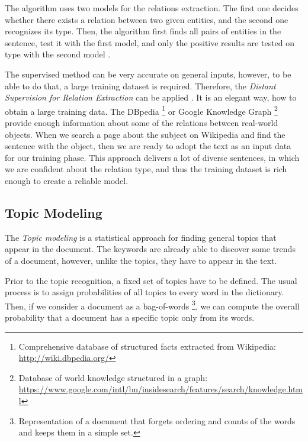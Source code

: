 \documentclass[
  digital, %
  table,   %
  lof,     %
  lot,     %
]{fithesis3}
\begin{document}
The algorithm uses two models for the relations extraction.
The first one decides whether there exists a relation between two given entities, and the second one recognizes its type. Then, the algorithm first finds all pairs of entities in the sentence, test it with the first model, and only the positive results are tested on type with the second model \cite[sec. 21.2]{jurafsky2014speech}.

The supervised method can be very accurate on general inputs, however, to be able to do that, a large training dataset is required.
Therefore, the \textit{Distant Supervision for Relation Extraction} can be applied \cite{mintz2009distant}.
It is an elegant way, how to obtain a large training data.
The DBpedia \footnote{Comprehensive database of structured facts extracted from Wikipedia: \mbox{\url{http://wiki.dbpedia.org/}}} or 
Google Knowledge Graph \footnote{Database of world knowledge structured in a graph: \url{https://www.google.com/intl/bn/insidesearch/features/search/knowledge.html}}
provide enough information about some of the relations between real-world objects.
When we search a page about the subject on Wikipedia and find the sentence with the object, then we are ready to adopt the text as an input data for our training phase.
This approach delivers a lot of diverse sentences, in which we are confident about the relation type, and thus the training dataset is rich enough to create a reliable model.

\subsection{Topic Modeling}
\label{topic_modeling}
The \textit{Topic modeling} is a statistical approach for finding general topics that appear in the document.
The keywords are already able to discover some trends of a document, however, unlike the topics, they have to appear in the text.

Prior to the topic recognition, a fixed set of topics have to be defined.
The usual process is to assign probabilities of all topics to every word in the dictionary.
Then, if we consider a document as a bag-of-words
\footnote{Representation of a document that forgets ordering and counts of the words and keeps them in a simple set.}, 
we can compute the overall probability that a document has a specific topic only from its words.
\end{document}
